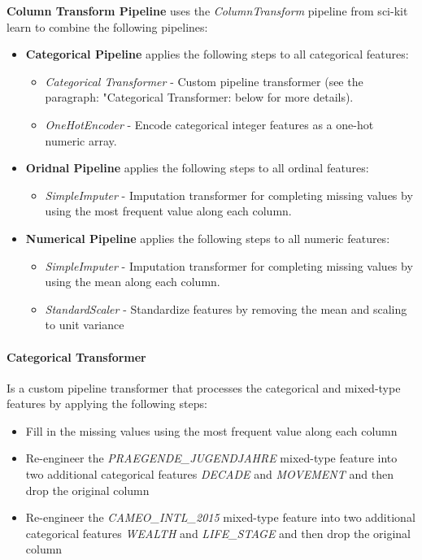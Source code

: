 \textbf{Column Transform Pipeline} uses the \emph{ColumnTransform} pipeline from sci-kit learn to combine the following pipelines:
\begin{itemize}
    \item \textbf{Categorical Pipeline} applies the following steps to all categorical features:
        \begin{itemize}
            \item \emph{Categorical Transformer} - Custom pipeline transformer (see the paragraph: "Categorical Transformer: below for more details).
            \item \emph{OneHotEncoder} - Encode categorical integer features as a one-hot numeric array.
        \end{itemize}
    \item \textbf{Oridnal Pipeline} applies the following steps to all ordinal features:
        \begin{itemize}
            \item \emph{SimpleImputer} - Imputation transformer for completing missing values by using the most frequent value along each column.
        \end{itemize}
    \item \textbf{Numerical Pipeline} applies the following steps to all numeric features:
        \begin{itemize}
            \item \emph{SimpleImputer} - Imputation transformer for completing missing values by using the mean along each column.
            \item \emph{StandardScaler} - Standardize features by removing the mean and scaling to unit variance
        \end{itemize}        
\end{itemize}

\paragraph{Categorical Transformer}Is a custom pipeline transformer that processes the categorical and mixed-type features by applying the following steps:
\begin{itemize}
    \item Fill in the missing values using the most frequent value along each column
    \item Re-engineer the \emph{PRAEGENDE\_JUGENDJAHRE} mixed-type feature into two additional categorical features \emph{DECADE} and \emph{MOVEMENT} and then drop the original column
    \item Re-engineer the \emph{CAMEO\_INTL\_2015} mixed-type feature into two additional categorical features \emph{WEALTH} and \emph{LIFE\_STAGE} and then drop the original column
\end{itemize}

